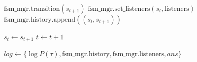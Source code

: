 \documentclass[11pt,a4paper]{article}
\begin{document}
\begin{algorithm}[htbp]
{    %
    
    $\text{fsm\_mgr}.\text{transition}(s_{t+1})$\;
    $\text{fsm\_mgr}.\text{set\_listeners}(s_t, \text{listeners})$\;
    $\text{fsm\_mgr}.\text{history}.\text{append}((s_t, s_{t+1}))$\;
    
    $s_t \leftarrow s_{t+1}$\;
    $t \leftarrow t + 1$\;
}

$log \leftarrow \{\log P(\tau), \text{fsm\_mgr}.\text{history}, \text{fsm\_mgr}.\text{listeners}, ans\}$\;

\end{algorithm}
\end{document}
